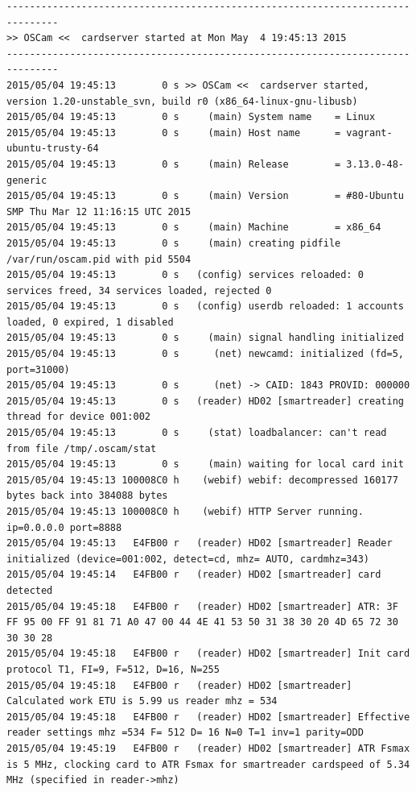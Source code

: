 \begin{cmd}[H]
\begin{Verbatim}[fontsize=\tiny]
-------------------------------------------------------------------------------
>> OSCam <<  cardserver started at Mon May  4 19:45:13 2015
-------------------------------------------------------------------------------
2015/05/04 19:45:13        0 s >> OSCam <<  cardserver started, version 1.20-unstable_svn, build r0 (x86_64-linux-gnu-libusb)
2015/05/04 19:45:13        0 s     (main) System name    = Linux
2015/05/04 19:45:13        0 s     (main) Host name      = vagrant-ubuntu-trusty-64
2015/05/04 19:45:13        0 s     (main) Release        = 3.13.0-48-generic
2015/05/04 19:45:13        0 s     (main) Version        = #80-Ubuntu SMP Thu Mar 12 11:16:15 UTC 2015
2015/05/04 19:45:13        0 s     (main) Machine        = x86_64
2015/05/04 19:45:13        0 s     (main) creating pidfile /var/run/oscam.pid with pid 5504
2015/05/04 19:45:13        0 s   (config) services reloaded: 0 services freed, 34 services loaded, rejected 0
2015/05/04 19:45:13        0 s   (config) userdb reloaded: 1 accounts loaded, 0 expired, 1 disabled
2015/05/04 19:45:13        0 s     (main) signal handling initialized
2015/05/04 19:45:13        0 s      (net) newcamd: initialized (fd=5, port=31000)
2015/05/04 19:45:13        0 s      (net) -> CAID: 1843 PROVID: 000000
2015/05/04 19:45:13        0 s   (reader) HD02 [smartreader] creating thread for device 001:002
2015/05/04 19:45:13        0 s     (stat) loadbalancer: can't read from file /tmp/.oscam/stat
2015/05/04 19:45:13        0 s     (main) waiting for local card init
2015/05/04 19:45:13 100008C0 h    (webif) webif: decompressed 160177 bytes back into 384088 bytes
2015/05/04 19:45:13 100008C0 h    (webif) HTTP Server running. ip=0.0.0.0 port=8888
2015/05/04 19:45:13   E4FB00 r   (reader) HD02 [smartreader] Reader initialized (device=001:002, detect=cd, mhz= AUTO, cardmhz=343)
2015/05/04 19:45:14   E4FB00 r   (reader) HD02 [smartreader] card detected
2015/05/04 19:45:18   E4FB00 r   (reader) HD02 [smartreader] ATR: 3F FF 95 00 FF 91 81 71 A0 47 00 44 4E 41 53 50 31 38 30 20 4D 65 72 30 30 30 28
2015/05/04 19:45:18   E4FB00 r   (reader) HD02 [smartreader] Init card protocol T1, FI=9, F=512, D=16, N=255
2015/05/04 19:45:18   E4FB00 r   (reader) HD02 [smartreader] Calculated work ETU is 5.99 us reader mhz = 534
2015/05/04 19:45:18   E4FB00 r   (reader) HD02 [smartreader] Effective reader settings mhz =534 F= 512 D= 16 N=0 T=1 inv=1 parity=ODD
2015/05/04 19:45:19   E4FB00 r   (reader) HD02 [smartreader] ATR Fsmax is 5 MHz, clocking card to ATR Fsmax for smartreader cardspeed of 5.34 MHz (specified in reader->mhz)

\end{Verbatim}
\end{cmd}
